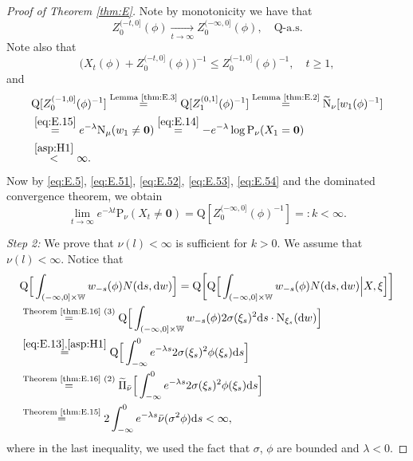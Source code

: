 \documentclass[12pt,a4paper]{amsart}
\numberwithin{equation}{section}
\theoremstyle{plain}
\theoremstyle{definition}
\theoremstyle{remark}
\begin{document}
\begin{proof}[Proof of Theorem \ref{thm:E}]
Note  by monotonicity we have that
\begin{equation} \label{eq:E.52}
	Z^{(-t,0]}_0(\phi)
	\xrightarrow[t\to \infty]{} Z^{(-\infty,0]}_0(\phi),
	\quad \mathrm Q\text{-a.s.}
\end{equation}
Note also that
	\begin{equation}\label{eq:E.53}
	\big(X_t(\phi) + Z^{(-t,0]}_0(\phi)\big)^{-1}
	\leq Z^{(-1,0]}_0(\phi)^{-1},
	\quad t\geq 1,
	\end{equation}
	and
	\begin{align}
	&\mathrm Q [Z^{(-1,0]}_0(\phi)^{-1}]
	\overset{\text{Lemma \ref{thm:E.3}}} = \mathrm Q [Z^{(0,1]}_1(\phi)^{-1}]
	 \overset{\text{Lemma \ref{thm:E.2}}}= 
	 \widetilde {\mathrm N}_\nu [w_1(\phi)^{-1}]
		\\&\overset{\eqref{eq:E.15}}= e^{-\lambda}
		\mathrm N_\mu(w_1\neq \mathbf 0)
	\overset{\eqref{eq:E.14}} = -e^{-\lambda} \log \mathrm P_{\nu}(X_1 = \mathbf 0)
	\\& \label{eq:E.54} \overset{\eqref{asp:H1}}< \infty.
	\end{align}
	Now by \eqref{eq:E.5}, \eqref{eq:E.51}, \eqref{eq:E.52}, \eqref{eq:E.53}, \eqref{eq:E.54} and the dominated  convergence theorem, we obtain
	\begin{equation}\label{eq:E.55}
		 \lim_{t\to\infty} e^{-\lambda t}\mathrm P_{\nu}(X_t \neq \mathbf 0)
	 =\mathrm Q[Z^{(-\infty,0]}_0(\phi)^{-1}]
	 =:k<\infty.
	\end{equation}

\emph{Step 2:} We prove that  $\nu(l)<\infty$ is sufficient for $k>0$.
	We assume that $\nu(l)<\infty$.
	Notice that
		\begin{align}
		&\mathrm Q\Big[\int_{(-\infty,0]\times \mathbb W}w_{-s}(\phi) N({\mathrm d}s, {\mathrm d}w) \Big]
	= \mathrm Q\bigg[\mathrm Q\Big[\int_{(-\infty,0]\times \mathbb W}w_{-s}(\phi) N({\mathrm d}s, {\mathrm d}w) \Big | X, \xi \Big]\bigg]
	\\& \overset{\text{Theorem \ref{thm:E.16} (3)}}= \mathrm Q\Big[\int_{(-\infty,0]\times \mathbb W}w_{-s}(\phi) 2 \sigma(\xi_s)^2 {\mathrm d}s \cdot \mathrm N_{\xi_s}({\mathrm d}w) \Big]
		\\& \overset{\eqref{eq:E.13}, \eqref{asp:H1}}=\mathrm Q \Big[\int^0_{-\infty} e^{-\lambda s} 2\sigma(\xi_s)^2 \phi(\xi_s) \mathrm ds\Big]
	\\&\overset{\text{Theorem \ref{thm:E.16} (2)}}=
\widetilde{\Pi}_{\bar \nu}
	\Big[\int^0_{-\infty} e^{-\lambda s} 2\sigma(\xi_s)^2 \phi(\xi_s) \mathrm ds\Big]
	\\&\label{eq:E.64}\overset{\text{Theorem \ref{thm:E.15}}}= 
	2\int^0_{-\infty} e^{-\lambda s} \bar\nu(\sigma^2 \phi) \mathrm ds
	<\infty,
	\end{align}
	where in the last inequality, we used the fact that $\sigma$, $\phi$ are bounded and $\lambda < 0$.


\end{proof}
\end{document}
